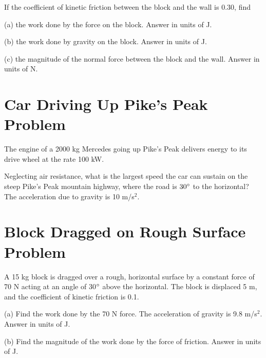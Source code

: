 \documentclass[../physics12.tex]{subfiles}
\begin{document}
If the coefficient of kinetic friction between the block and the wall is 0.30, find 

(a) the work done by the force on the block.
Answer in units of J.

(b) the work done by gravity on the block.
Answer in units of J.

(c) the magnitude of the normal force between the block and the wall.
Answer in units of N.
\section{Car Driving Up Pike's Peak Problem}
The engine of a 2000 kg Mercedes going up Pike's Peak delivers energy to its drive wheel at the rate 100 kW.

Neglecting air resistance, what is the largest speed the car can sustain on the steep Pike's Peak mountain highway, 
where the road is $30\degree$ to the horizontal? The acceleration due to gravity is 10 m/s$^2$.

\section{Block Dragged on Rough Surface Problem}
A 15 kg block is dragged over a rough, horizontal surface by a constant force of 70 N acting at an angle of 30$\degree$ above the horizontal.
The block is displaced 5 m, and the coefficient of kinetic friction is 0.1.

(a) Find the work done by the 70 N force. The acceleration of gravity is 9.8 m/s$^2$. 
Answer in units of J.

(b) Find the magnitude of the work done by the force of friction. 
Answer in units of J.
\end{document}
